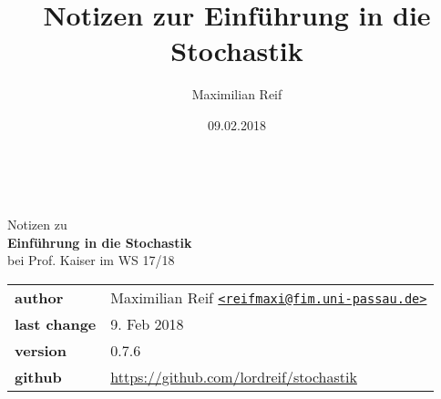 \documentclass[11pt,a4paper,ngerman]{article}
\date{09.02.2018}
\author{Maximilian Reif}
\title{Notizen zur Einführung in die Stochastik}
\newcommand{\1}{\mathbbm{1}}
\begin{document}
\begin{titlepage}
    \ \newline\newline\newline\newline\newline
	
	\begin{center}

		\huge Notizen zu\\
		\Huge\textbf{Einführung in die Stochastik}\\
		\huge bei Prof. Kaiser im WS 17/18\\
		\normalsize

		\vspace{1cm}
		\begin{tabular}[b]{l|l}
			\textbf{author} 		& Maximilian Reif
			\texttt{\href{mailto:reifmaxi@fim.uni-passau.de}
			{<reifmaxi@fim.uni-passau.de>}}\\
			\textbf{last change}	& 9. Feb 2018 \\
			\textbf{version} 	& 0.7.6\\
			\textbf{github} 		& \url{https://github.com/lordreif/stochastik}
		\end{tabular}
		\vspace{1cm}
		
	\end{center}
	
	\begin{figure}[b]
	\centering
	\end{figure}
	
\end{titlepage}

%

\newpage
\tableofcontents\thispagestyle{empty}
\newpage

\setcounter{page}{1}





%

\end{document}
